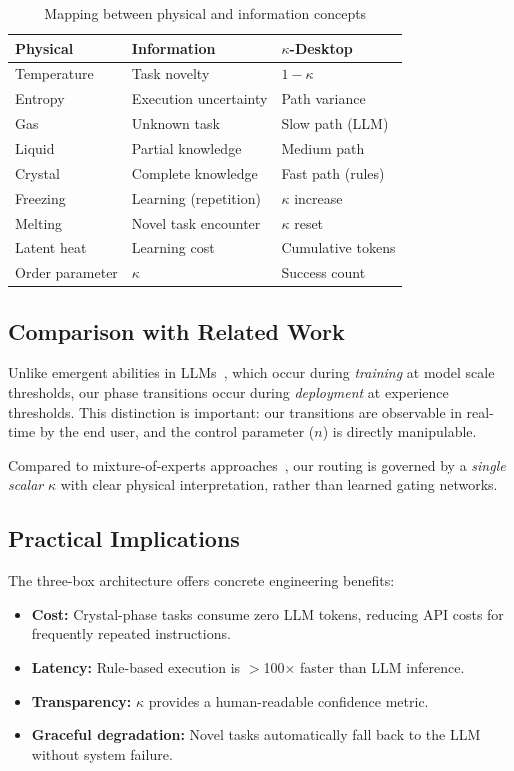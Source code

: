 \documentclass[10pt,twocolumn]{article}
\newcommand{\kap}{\kappa}
\newcommand{\kdes}{$\kappa$-Desktop}
\begin{document}
\begin{table}[H]
\centering
\caption{Mapping between physical and information concepts}
\label{tab:analogy}
\begin{tabular}{lll}
\toprule
\textbf{Physical} & \textbf{Information} & 
  \textbf{\kdes{}} \\
\midrule
Temperature & Task novelty & $1-\kap$ \\
Entropy & Execution uncertainty & Path variance \\
Gas & Unknown task & Slow path (LLM) \\
Liquid & Partial knowledge & Medium path \\
Crystal & Complete knowledge & Fast path (rules) \\
Freezing & Learning (repetition) & $\kap$ increase \\
Melting & Novel task encounter & $\kap$ reset \\
Latent heat & Learning cost & Cumulative tokens \\
Order parameter & $\kap$ & Success count \\
\bottomrule
\end{tabular}
\end{table}

\subsection{Comparison with Related Work}

Unlike emergent abilities in LLMs~\cite{wei2022}, which 
occur during \textit{training} at model scale thresholds, 
our phase transitions occur during \textit{deployment} at 
experience thresholds. This distinction is important: our 
transitions are observable in real-time by the end user, 
and the control parameter ($n$) is directly manipulable.

Compared to mixture-of-experts approaches~\cite{shazeer2017}, 
our routing is governed by a \textit{single scalar} $\kap$ 
with clear physical interpretation, rather than learned 
gating networks.

\subsection{Practical Implications}

The three-box architecture offers concrete engineering 
benefits:
\begin{itemize}[leftmargin=*, itemsep=2pt]
  \item \textbf{Cost:} Crystal-phase tasks consume zero LLM 
    tokens, reducing API costs for frequently repeated 
    instructions.
  \item \textbf{Latency:} Rule-based execution is 
    $>$100$\times$ faster than LLM inference.
  \item \textbf{Transparency:} $\kap$ provides a 
    human-readable confidence metric.
  \item \textbf{Graceful degradation:} Novel tasks 
    automatically fall back to the LLM without system 
    failure.
\end{itemize}
\end{document}
